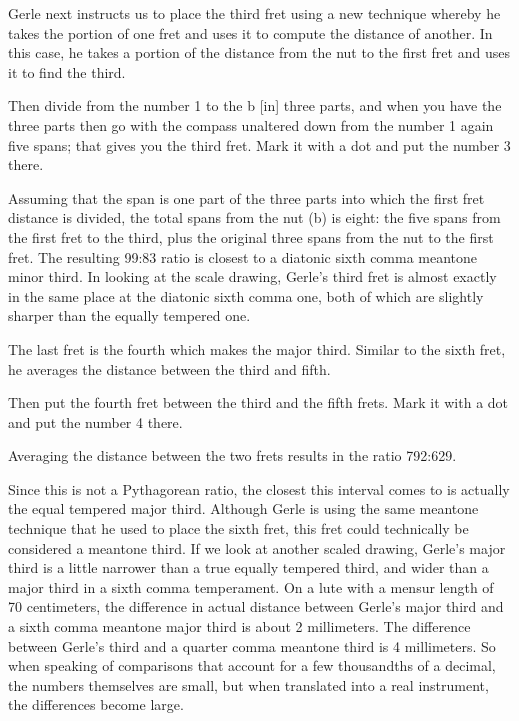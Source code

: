 Gerle next instructs us to place the third fret using a new technique whereby he
takes the portion of one fret and uses it to compute the distance of another.
In this case, he takes a portion of the distance from the nut to the first fret
and uses it to find the third.
\begin{blocks}
Then divide from the number 1 to the b [in] three parts, and when you have the
three parts then go with the compass unaltered down from the number 1 again five
spans; that gives you the third fret.  Mark it with a dot and put the number 3
there.
\end{blocks}
Assuming that the span is one part of the three parts into which the first fret
distance is divided, the total spans from the nut (b) is eight: the five spans
from the first fret to the third, plus the original three spans from the nut to
the first fret.  The resulting 99:83 ratio is closest to a diatonic sixth comma
meantone minor third.  In looking at the scale drawing, Gerle's third fret is
almost exactly in the same place at the diatonic sixth comma one, both of which
are slightly sharper than the equally tempered one.


The last fret is the fourth which makes the major
third.  Similar to the sixth fret, he averages the distance between the third
and fifth.
\begin{blocks}
Then put the fourth fret between the third and the fifth frets.  Mark it with a
dot and put the number 4 there.
\end{blocks}
Averaging the distance between the two frets results in the ratio 792:629.


Since this is not a Pythagorean ratio, the closest this interval comes to is
actually the equal tempered major third. Although Gerle is using the same meantone
technique that he used to place the sixth fret, this fret could technically be
considered a meantone third. If we look at another scaled drawing, Gerle's
major third is a little narrower than a true equally tempered third, and wider than a major third
in a sixth comma temperament.  On a lute with a mensur length of 70 centimeters,
the difference in actual distance between Gerle's major third and a sixth comma
meantone major third is about 2 millimeters.  The difference between Gerle's
third and a quarter comma meantone third is 4 millimeters.  So when speaking of
comparisons that account for a few thousandths of a decimal, the numbers
themselves are small, but when translated into a real instrument, the
differences become large.

